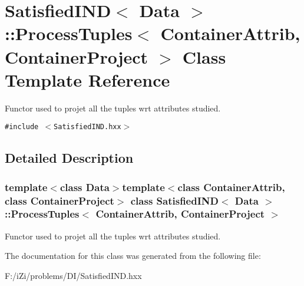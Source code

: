 \section{Satisfied\-IND$<$ Data $>$::Process\-Tuples$<$ Container\-Attrib, Container\-Project $>$ Class Template Reference}
\label{class_satisfied_i_n_d_1_1_process_tuples}
Functor used to projet all the tuples wrt attributes studied.  


{\tt \#include $<$Satisfied\-IND.hxx$>$}



\subsection{Detailed Description}
\subsubsection*{template$<$class Data$>$template$<$class Container\-Attrib, class Container\-Project$>$ class Satisfied\-IND$<$ Data $>$::Process\-Tuples$<$ Container\-Attrib, Container\-Project $>$}

Functor used to projet all the tuples wrt attributes studied. 



The documentation for this class was generated from the following file:\begin{CompactItemize}
\item 
F:/i\-Zi/problems/DI/Satisfied\-IND.hxx\end{CompactItemize}
